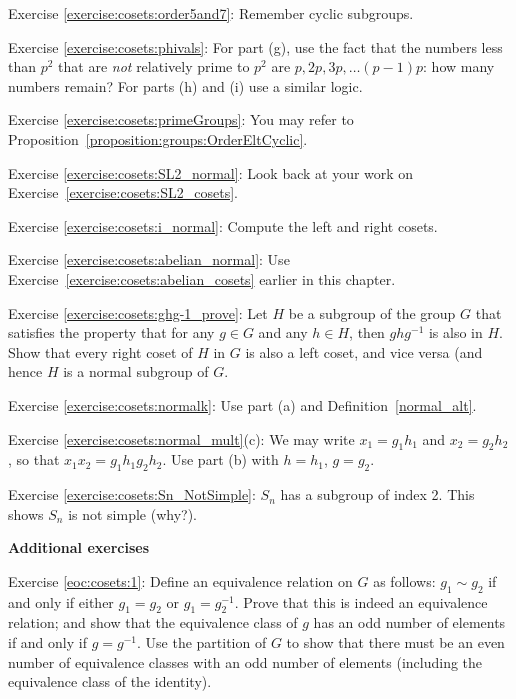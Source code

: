 \noindent Exercise \ref{exercise:cosets:order5and7}:  Remember cyclic subgroups.

\noindent Exercise \ref{exercise:cosets:phivals}:   For part (g), use the fact that the numbers less than $p^2$ that are \emph{not} relatively prime to $p^2$ are $p, 2p, 3p, \ldots (p-1)p$: how many numbers remain? For parts (h) and (i) use a similar logic.
 
\noindent Exercise \ref{exercise:cosets:primeGroups}:
You may refer to Proposition~\ref{proposition:groups:OrderEltCyclic}.

\noindent Exercise \ref{exercise:cosets:SL2_normal}:
Look back at your work on Exercise~\ref{exercise:cosets:SL2_cosets}.

\noindent Exercise \ref{exercise:cosets:i_normal}:
Compute the left and right cosets.

\noindent Exercise \ref{exercise:cosets:abelian_normal}: Use  Exercise~\ref{exercise:cosets:abelian_cosets} earlier in this chapter.

\noindent Exercise \ref{exercise:cosets:ghg-1_prove}: Let $H$ be a subgroup of the group $G$ that satisfies the property that  for any $g \in G$ and any $h \in H$, then $ghg^{-1}$ is also in $H$. Show that every right coset of $H$ in $G$ is also a left coset, and vice versa (and hence $H$ is a normal subgroup of $G$.

\noindent Exercise \ref{exercise:cosets:normalk}:   Use part (a) and Definition~\ref{normal_alt}.

\noindent Exercise \ref{exercise:cosets:normal_mult}(c):  We may write $x_1 = g_1 h_1$ and $x_2 = g_2 h_2$, so that $x_1 x_2 = g_1 h_1 g_2 h_2$.  Use part (b) with $h=h_1$, $g=g_2$.

\noindent Exercise \ref{exercise:cosets:Sn_NotSimple}:  $S_n$ has a subgroup of index 2.  This shows $S_n$ is not simple  (why?).
\medskip

\textbf{Additional exercises}

\noindent Exercise \ref{eoc:cosets:1}:  Define an equivalence relation on $G$ as follows: $g_1 \sim g_2$ if and only if either $g_1 = g_2$ or $g_1 = g_2^{-1}$. Prove that this is indeed an equivalence relation; and show that the equivalence class of $g$ has an odd number of elements if and only if $g = g^{-1}$. Use the partition of $G$ to show that there must be an even number of  equivalence classes with an odd number of elements (including the equivalence class of the identity).

